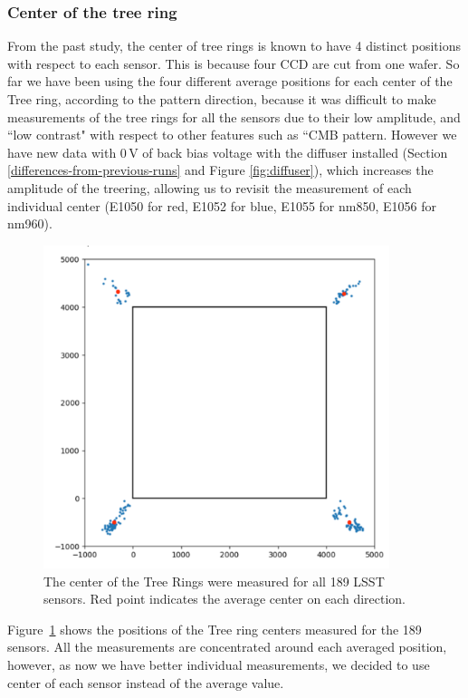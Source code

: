 \subsubsection{Center of the tree ring}
From the past study, the center of tree rings is known to have 4 distinct positions with respect to each sensor. This is because four CCD are cut from one wafer. 
So far we have been using the four different average positions for each center of the Tree ring, according to the pattern direction, because it was difficult to make measurements of the tree rings for all the sensors due to their low amplitude, and ``low contrast" with respect to other features such as ``CMB pattern. However we have new data with 0\,V of back bias voltage with the diffuser installed (Section \ref{differences-from-previous-runs} and Figure \ref{fig:diffuser}), which increases the amplitude of the treering, allowing us to revisit the measurement of each individual center (E1050 for red, E1052 for blue, E1055 for nm850, E1056 for nm960).

\begin{figure}[ht]
\begin{centering}
\includegraphics[width=0.9\textwidth]{figures/TR_centers.png}
\end{centering}
\caption{The center of the Tree Rings were measured for all 189 LSST sensors. Red point indicates the average center on each direction.}
\label{fig:tree_ring_center}
\end{figure}
Figure~\ref{fig:tree_ring_center} shows the positions of the Tree ring centers measured for the 189 sensors. All the measurements are concentrated around each averaged position, however, as now we have better individual measurements, we decided to use center of each sensor instead of the average value. 


